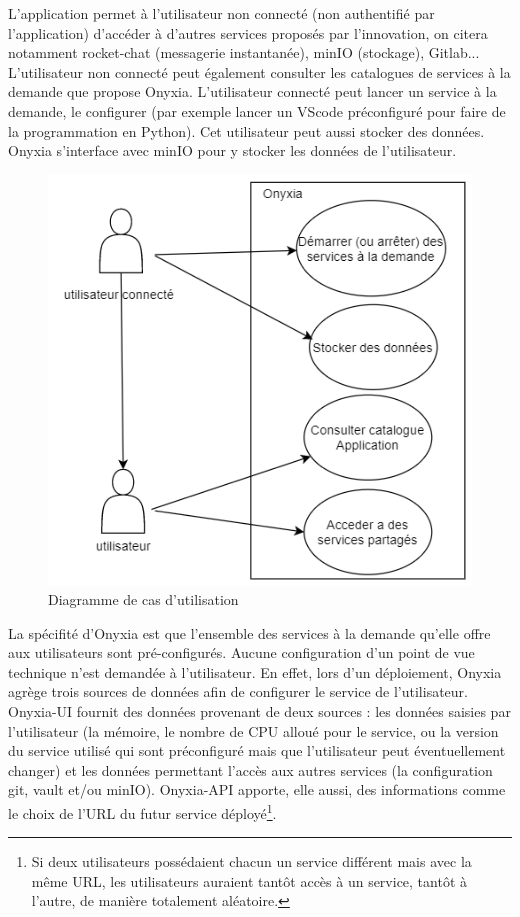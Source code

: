 \documentclass[11pt,fleqn]{book} %
\begin{document}
L'application permet à l'utilisateur non connecté (non authentifié par l'application) d'accéder à d'autres services proposés par l'innovation, on citera notamment rocket-chat (messagerie instantanée), minIO (stockage), Gitlab... L'utilisateur non connecté peut également consulter les catalogues de services à la demande que propose Onyxia. L'utilisateur connecté peut lancer un service à la demande, le configurer (par exemple lancer un VScode préconfiguré pour faire de la programmation en Python). Cet utilisateur peut aussi stocker des données. Onyxia s'interface avec minIO pour y stocker les données de l'utilisateur.\\
\begin{figure}
    \renewcommand{\figurename}{Diagramme}
    \includegraphics[scale=0.7]{Pictures/onyxia/onyxia-cu.PNG}
    \caption[]{Diagramme de cas d'utilisation \newline}
\end{figure}

La spécifité d'Onyxia est que l'ensemble des services à la demande qu'elle offre aux utilisateurs sont pré-configurés. Aucune configuration d'un point de vue technique n'est demandée à l'utilisateur. En effet, lors d'un déploiement, Onyxia agrège trois sources de données afin de configurer le service de l'utilisateur. \\

Onyxia-UI fournit des données provenant de deux sources : les données saisies par l'utilisateur (la mémoire, le nombre de CPU alloué pour le service, ou la version du service utilisé qui sont préconfiguré mais que l'utilisateur peut éventuellement changer) et les données permettant l'accès aux autres services (la configuration git, vault et/ou minIO). Onyxia-API apporte, elle aussi, des informations comme le choix de l'URL du futur service déployé\footnote{Si deux utilisateurs possédaient chacun un service différent mais avec la même URL, les utilisateurs auraient tantôt accès à un service, tantôt à l'autre, de manière totalement aléatoire.}.\\
\end{document}
